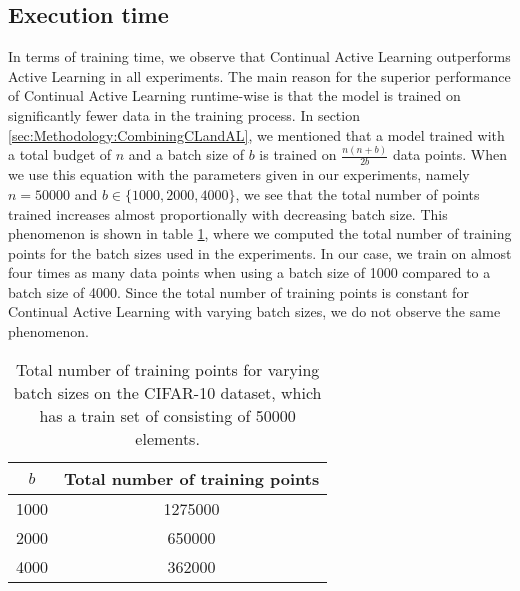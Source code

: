 \subsection{Execution time}
\label{sec:Discussion:ExecutionTime}
In terms of training time, we observe that Continual Active Learning outperforms Active Learning in all experiments. The main reason for the superior
performance of Continual Active Learning runtime-wise is that the model is trained on significantly fewer data in the training process. In section
\ref{sec:Methodology:CombiningCLandAL}, we mentioned that a model trained with a total budget of $n$ and a batch size of $b$ is trained on $\frac{n(n+b)}{2b}$
data points. When we use this equation with the parameters given in our experiments, namely $n=50000$ and $b \in \{ 1000, 2000, 4000\}$, we see that
the total number of points trained increases almost proportionally with decreasing batch size. This phenomenon is shown in table 
\ref{fig:NumberOfTrainingPoints}, where we computed the total number of training points for the batch sizes used in the experiments. In our case,
we train on almost four times as many data points when using a batch size of 1000 compared to a batch size of 4000. Since the total number of training
points is constant for Continual Active Learning with varying batch sizes, we do not observe the same phenomenon. \par

\begin{table}[h]
    \centering
    \begin{tabular}{| c | c |} 
        \hline
        $b$ & Total number of training points \\
        \hline 
        1000 & 1275000 \\
        2000 & 650000 \\
        4000 & 362000 \\
        \hline
    \end{tabular}
    \caption[Total number of data points trained on in the Continual Active Learning experiments]{Total number of training points for varying batch
    sizes on the CIFAR-10 dataset, which has a train set of consisting of 50000 elements.}
    \label{fig:NumberOfTrainingPoints}
\end{table}

